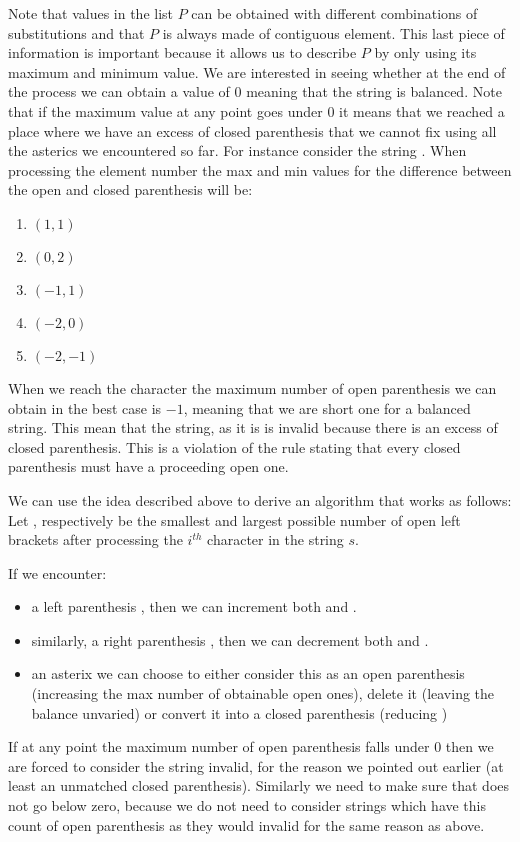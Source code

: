 Note that values in the list $P$ can be obtained with different combinations of substitutions and that $P$ is always made of contiguous element. This last piece of information is important because it allows us to describe $P$ by only using its maximum and minimum value. We are interested in seeing whether at the end of the process we can obtain a value of $0$ meaning that the string is balanced. Note that if the maximum value at any point goes under $0$ it means that we reached a place where we have an excess of closed parenthesis that we cannot fix using all the asterics we encountered so far. For instance consider the string . When processing the element number the max and min values for the difference between the open and closed parenthesis will be:
\begin{enumerate}
	\item $(1,1)$
	\item $(0,2)$
	\item $(-1,1)$
	\item $(-2,0)$ 
	\item $(-2,-1)$ 
\end{enumerate}
When we reach the  character the maximum number of open parenthesis we can obtain in the best case is $-1$, meaning that we are short one for a balanced string. This mean that the string, as it is is invalid because there is an excess of closed parenthesis. This is a violation of the rule stating that every closed parenthesis must have a proceeding open one.

We can use the idea described above to derive an algorithm  that works as follows:
Let ,  respectively be the smallest and largest possible number of open left brackets after processing the $i^{th}$ character in the string $s$.

If we encounter:
\begin{itemize}
	\item a left parenthesis \fbox{(}, then we can increment both  and .
	\item similarly, a right parenthesis \fbox{)}, then we can decrement both  and .
	\item an asterix \fbox{*} we can choose to either consider this as an open parenthesis (increasing the max number of obtainable open ones), delete it (leaving the balance unvaried) or convert it into a closed parenthesis (reducing  )
\end{itemize}
If at any point the maximum number of open parenthesis falls under $0$ then we are forced to consider the string invalid, for the reason we pointed out earlier (at least an unmatched closed parenthesis). Similarly we need to make sure that  does not go below zero, because we do not need to consider strings which have this count of open parenthesis as they would invalid for the same reason as above.


